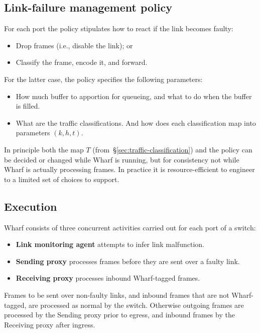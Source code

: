 \documentclass[sigconf]{acmart}
\newcommand{\OurSys}{Wharf\xspace}
\begin{document}
\subsection{Link-failure management policy}
\label{sec:policy}
For each port the policy stipulates how to react if the link becomes faulty:
  \begin{itemize}
    \item Drop frames (i.e., disable the link); or
    \item Classify the frame, encode it, and forward.
  \end{itemize}
For the latter case, the policy specifies the following parameters:
\begin{itemize}
  \item How much buffer to apportion for queueing,
      and what to do when the buffer is filled.
  \item What are the traffic classifications.
    And how does each classification map into parameters $(k, h, t)$.
\end{itemize}
In principle both the map $T$ (from~\S\ref{sec:traffic-classification}) and
the policy can be decided or changed while \OurSys is running, but for
consistency not while \OurSys is actually processing frames. In practice it is
resource-efficient to engineer to a limited set of choices to support.


\subsection{Execution}
\OurSys consists of three concurrent activities carried out for each port of a
switch:
\begin{itemize}
  \item \textbf{Link monitoring agent} attempts to infer link malfunction.
  \item \textbf{Sending proxy} processes frames before they are sent over a faulty link.
  \item \textbf{Receiving proxy} processes inbound \OurSys-tagged frames.
\end{itemize}

Frames to be sent over non-faulty links, and inbound frames that are not
\OurSys-tagged, are processed as normal by the switch. Otherwise outgoing frames
are processed by the Sending proxy prior to egress, and inbound frames by
the Receiving proxy after ingress.
\end{document}
